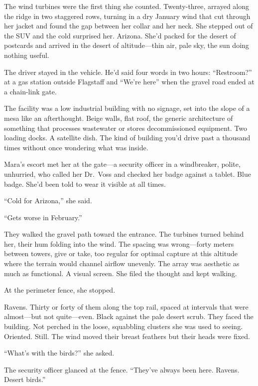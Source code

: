 

The wind turbines were the first thing she counted. Twenty-three, arrayed along the ridge in two staggered rows, turning in a dry January wind that cut through her jacket and found the gap between her collar and her neck. She stepped out of the SUV and the cold surprised her. Arizona. She'd packed for the desert of postcards and arrived in the desert of altitude---thin air, pale sky, the sun doing nothing useful.

The driver stayed in the vehicle. He'd said four words in two hours: ``Restroom?'' at a gas station outside Flagstaff and ``We're here'' when the gravel road ended at a chain-link gate.

The facility was a low industrial building with no signage, set into the slope of a mesa like an afterthought. Beige walls, flat roof, the generic architecture of something that processes wastewater or stores decommissioned equipment. Two loading docks. A satellite dish. The kind of building you'd drive past a thousand times without once wondering what was inside.

Mara's escort met her at the gate---a security officer in a windbreaker, polite, unhurried, who called her Dr.\ Voss and checked her badge against a tablet. Blue badge. She'd been told to wear it visible at all times.

``Cold for Arizona,'' she said.

``Gets worse in February.''

They walked the gravel path toward the entrance. The turbines turned behind her, their hum folding into the wind. The spacing was wrong---forty meters between towers, give or take, too regular for optimal capture at this altitude where the terrain would channel airflow unevenly. The array was aesthetic as much as functional. A visual screen. She filed the thought and kept walking.

At the perimeter fence, she stopped.

Ravens. Thirty or forty of them along the top rail, spaced at intervals that were almost---but not quite---even. Black against the pale desert scrub. They faced the building. Not perched in the loose, squabbling clusters she was used to seeing. Oriented. Still. The wind moved their breast feathers but their heads were fixed.

``What's with the birds?'' she asked.

The security officer glanced at the fence. ``They've always been here. Ravens. Desert birds.''

